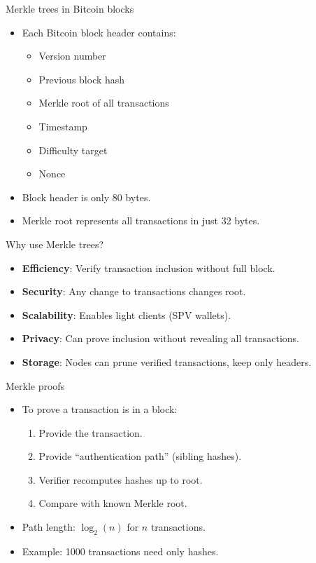 \documentclass[aspectratio=169, lualatex, handout]{beamer}
\begin{document}
\begin{frame}{Merkle trees in Bitcoin blocks}
	\begin{itemize}
		\item Each Bitcoin block header contains:
		      \begin{itemize}
			      \item Version number
			      \item Previous block hash
			      \item Merkle root of all transactions
			      \item Timestamp
			      \item Difficulty target
			      \item Nonce
		      \end{itemize}
		\item Block header is only 80 bytes.
		\item Merkle root represents all transactions in just 32 bytes.
	\end{itemize}
\end{frame}

\begin{frame}{Why use Merkle trees?}
	\begin{itemize}
		\item \textbf{Efficiency}: Verify transaction inclusion without full block.
		\item \textbf{Security}: Any change to transactions changes root.
		\item \textbf{Scalability}: Enables light clients (SPV wallets).
		\item \textbf{Privacy}: Can prove inclusion without revealing all transactions.
		\item \textbf{Storage}: Nodes can prune verified transactions, keep only headers.
	\end{itemize}
\end{frame}

\begin{frame}{Merkle proofs}
	\begin{itemize}
		\item To prove a transaction is in a block:
		      \begin{enumerate}
			      \item Provide the transaction.
			      \item Provide ``authentication path'' (sibling hashes).
			      \item Verifier recomputes hashes up to root.
			      \item Compare with known Merkle root.
		      \end{enumerate}
		\item Path length: $\log_2(n)$ for $n$ transactions.
		\item Example: 1000 transactions need only  hashes.
	\end{itemize}
\end{frame}
\end{document}
